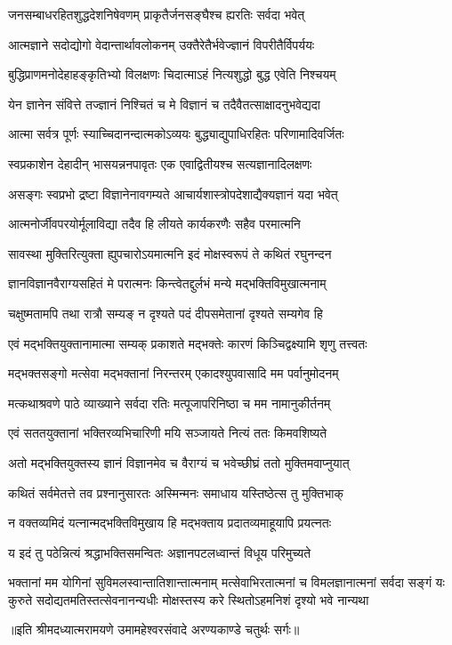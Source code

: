 \twolineshloka
{जनसम्बाधरहितशुद्धदेशनिषेवणम्}
{प्राकृतैर्जनसङ्घैश्च ह्यरतिः सर्वदा भवेत्} %

\twolineshloka
{आत्मज्ञाने सदोद्योगो वेदान्तार्थावलोकनम्}
{उक्तैरेतैर्भवेज्ज्ञानं विपरीतैर्विपर्ययः} %

\twolineshloka
{बुद्धिप्राणमनोदेहाहङ्कृतिभ्यो विलक्षणः}
{चिदात्माऽहं नित्यशुद्धो बुद्ध एवेति निश्चयम्} %

\twolineshloka
{येन ज्ञानेन संवित्ते तज्ज्ञानं निश्चितं च मे}
{विज्ञानं च तदैवैतत्साक्षादनुभवेद्यदा} %

\twolineshloka
{आत्मा सर्वत्र पूर्णः स्याच्चिदानन्दात्मकोऽव्ययः}
{बुद्ध्याद्युपाधिरहितः परिणामादिवर्जितः} %

\twolineshloka
{स्वप्रकाशेन देहादीन् भासयन्ननपावृतः}
{एक एवाद्वितीयश्च सत्यज्ञानादिलक्षणः} %

\twolineshloka
{असङ्गः स्वप्रभो द्रष्टा विज्ञानेनावगम्यते}
{आचार्यशास्त्रोपदेशाद्यैक्यज्ञानं यदा भवेत्} %

\twolineshloka
{आत्मनोर्जीवपरयोर्मूलाविद्या तदैव हि}
{लीयते कार्यकरणैः सहैव परमात्मनि} %

\twolineshloka
{सावस्था मुक्तिरित्युक्ता ह्युपचारोऽयमात्मनि}
{इदं मोक्षस्वरूपं ते कथितं रघुनन्दन} %

\twolineshloka
{ज्ञानविज्ञानवैराग्यसहितं मे परात्मनः}
{किन्त्वेतद्दुर्लभं मन्ये मद्भक्तिविमुखात्मनाम्} %

\twolineshloka
{चक्षुष्मतामपि तथा रात्रौ सम्यङ् न दृश्यते}
{पदं दीपसमेतानां दृश्यते सम्यगेव हि} %

\twolineshloka
{एवं मद्भक्तियुक्तानामात्मा सम्यक् प्रकाशते}
{मद्भक्तेः कारणं किञ्चिद्वक्ष्यामि शृणु तत्त्वतः} %

\twolineshloka
{मद्भक्तसङ्गो मत्सेवा मद्भक्तानां निरन्तरम्}
{एकादश्युपवासादि मम पर्वानुमोदनम्} %

\twolineshloka
{मत्कथाश्रवणे पाठे व्याख्याने सर्वदा रतिः}
{मत्पूजापरिनिष्ठा च मम नामानुकीर्तनम्} %

\twolineshloka
{एवं सततयुक्तानां भक्तिरव्यभिचारिणी}
{मयि सञ्जायते नित्यं ततः किमवशिष्यते} %

\twolineshloka
{अतो मद्भक्तियुक्तस्य ज्ञानं विज्ञानमेव च}
{वैराग्यं च भवेच्छीघ्रं ततो मुक्तिमवाप्नुयात्} %

\twolineshloka
{कथितं सर्वमेतत्ते तव प्रश्नानुसारतः}
{अस्मिन्मनः समाधाय यस्तिष्ठेत्स तु मुक्तिभाक्} %

\twolineshloka
{न वक्तव्यमिदं यत्नान्मद्भक्तिविमुखाय हि}
{मद्भक्ताय प्रदातव्यमाहूयापि प्रयत्नतः} %

\twolineshloka
{य इदं तु पठेन्नित्यं श्रद्धाभक्तिसमन्वितः}
{अज्ञानपटलध्वान्तं विधूय परिमुच्यते} %

\fourlineindentedshloka
{भक्तानां मम योगिनां सुविमलस्वान्तातिशान्तात्मनाम्}
{मत्सेवाभिरतात्मनां च विमलज्ञानात्मनां सर्वदा}
{सङ्गं यः कुरुते सदोद्यतमतिस्तत्सेवनानन्यधीः}
{मोक्षस्तस्य करे स्थितोऽहमनिशं दृश्यो भवे नान्यथा} %

{॥इति श्रीमदध्यात्मरामयणे उमामहेश्वरसंवादे
अरण्यकाण्डे चतुर्थः सर्गः॥}
